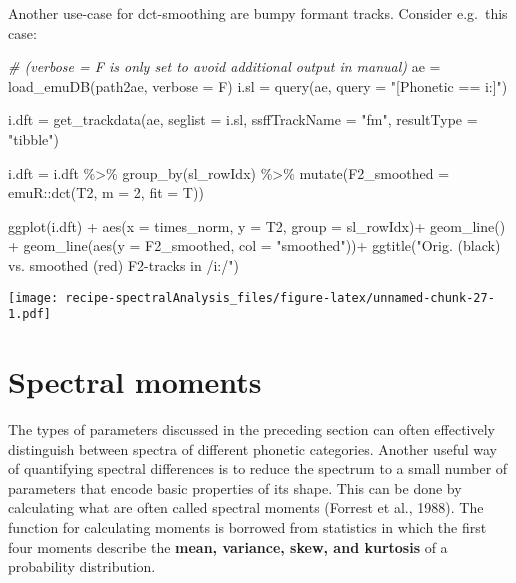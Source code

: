 \documentclass[
]{book}
\newenvironment{Shaded}{\begin{snugshade}}{\end{snugshade}}
\newcommand{\AttributeTok}[1]{\textcolor[rgb]{0.77,0.63,0.00}{#1}}
\newcommand{\CommentTok}[1]{\textcolor[rgb]{0.56,0.35,0.01}{\textit{#1}}}
\newcommand{\DecValTok}[1]{\textcolor[rgb]{0.00,0.00,0.81}{#1}}
\newcommand{\FunctionTok}[1]{\textcolor[rgb]{0.00,0.00,0.00}{#1}}
\newcommand{\NormalTok}[1]{#1}
\newcommand{\OtherTok}[1]{\textcolor[rgb]{0.56,0.35,0.01}{#1}}
\newcommand{\SpecialCharTok}[1]{\textcolor[rgb]{0.00,0.00,0.00}{#1}}
\newcommand{\StringTok}[1]{\textcolor[rgb]{0.31,0.60,0.02}{#1}}
\begin{document}
Another use-case for dct-smoothing are bumpy formant tracks. Consider e.g.~this case:

\begin{Shaded}
\begin{Highlighting}[]
\CommentTok{\# (verbose = F is only set to avoid additional output in manual)}
\NormalTok{ae }\OtherTok{=} \FunctionTok{load\_emuDB}\NormalTok{(path2ae, }\AttributeTok{verbose =}\NormalTok{ F)}
\NormalTok{i.sl }\OtherTok{=} \FunctionTok{query}\NormalTok{(ae, }
             \AttributeTok{query =} \StringTok{"[Phonetic == i:]"}\NormalTok{)}

\NormalTok{i.dft }\OtherTok{=} \FunctionTok{get\_trackdata}\NormalTok{(ae, }
                      \AttributeTok{seglist =}\NormalTok{ i.sl, }
                      \AttributeTok{ssffTrackName =} \StringTok{"fm"}\NormalTok{, }
                      \AttributeTok{resultType =} \StringTok{"tibble"}\NormalTok{)}

\NormalTok{i.dft }\OtherTok{=}\NormalTok{ i.dft }\SpecialCharTok{\%\textgreater{}\%}
  \FunctionTok{group\_by}\NormalTok{(sl\_rowIdx) }\SpecialCharTok{\%\textgreater{}\%}
  \FunctionTok{mutate}\NormalTok{(}\AttributeTok{F2\_smoothed =}\NormalTok{ emuR}\SpecialCharTok{::}\FunctionTok{dct}\NormalTok{(T2, }\AttributeTok{m =} \DecValTok{2}\NormalTok{, }\AttributeTok{fit =}\NormalTok{ T))}

\FunctionTok{ggplot}\NormalTok{(i.dft) }\SpecialCharTok{+}
  \FunctionTok{aes}\NormalTok{(}\AttributeTok{x =}\NormalTok{ times\_norm, }\AttributeTok{y =}\NormalTok{ T2, }\AttributeTok{group =}\NormalTok{ sl\_rowIdx)}\SpecialCharTok{+}
  \FunctionTok{geom\_line}\NormalTok{() }\SpecialCharTok{+}
  \FunctionTok{geom\_line}\NormalTok{(}\FunctionTok{aes}\NormalTok{(}\AttributeTok{y =}\NormalTok{ F2\_smoothed, }\AttributeTok{col =} \StringTok{"smoothed"}\NormalTok{))}\SpecialCharTok{+}
  \FunctionTok{ggtitle}\NormalTok{(}\StringTok{"Orig. (black) vs. smoothed (red) F2{-}tracks in /i:/"}\NormalTok{)}
\end{Highlighting}
\end{Shaded}

\texttt{[image: recipe-spectralAnalysis\_files/figure-latex/unnamed-chunk-27-1.pdf]}

\hypertarget{spectral-moments}{%
\section{Spectral moments}\label{spectral-moments}}

The types of parameters discussed in the preceding section can often effectively distinguish between spectra of different phonetic categories. Another useful way of quantifying spectral differences is to reduce the spectrum to a small number of parameters that encode basic properties of its shape. This can be done by calculating what are often called spectral moments (Forrest et al., 1988). The function for calculating moments is borrowed from statistics in which the first four moments describe the \textbf{mean, variance, skew, and kurtosis} of a probability distribution.
\end{document}
